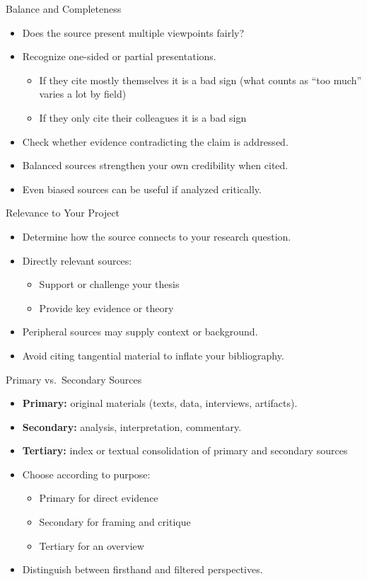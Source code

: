 \documentclass[aspectratio=169]{beamer}
\begin{document}
\begin{frame}{Balance and Completeness}
\begin{itemize}
  \item Does the source present multiple viewpoints fairly?
  \item Recognize one-sided or partial presentations.
    \begin{itemize}
    \item If they cite mostly themselves it is a bad sign (what counts as
      ``too much'' varies a lot by field)
    \item If they only cite their colleagues it is a bad sign
    \end{itemize}
  \item Check whether evidence contradicting the claim is addressed.
  \item Balanced sources strengthen your own credibility when cited.
  \item Even biased sources can be useful if analyzed critically.
\end{itemize}
\end{frame}

\begin{frame}{Relevance to Your Project}
\begin{itemize}
  \item Determine how the source connects to your research question.
  \item Directly relevant sources:
    \begin{itemize}
      \item Support or challenge your thesis
      \item Provide key evidence or theory
    \end{itemize}
  \item Peripheral sources may supply context or background.
  \item Avoid citing tangential material to inflate your bibliography.
\end{itemize}
\end{frame}

\begin{frame}{Primary vs.\ Secondary Sources}
\begin{itemize}
  \item \textbf{Primary:} original materials (texts, data, interviews, artifacts).
  \item \textbf{Secondary:} analysis, interpretation, commentary.
  \item  \textbf{Tertiary:} index or textual consolidation of  primary and secondary sources
  \item Choose according to purpose:
    \begin{itemize}
      \item Primary for direct evidence
      \item Secondary for framing and critique
      \item Tertiary for an overview
    \end{itemize}
  \item Distinguish between firsthand and filtered perspectives.
\end{itemize}
\end{frame}
\end{document}
